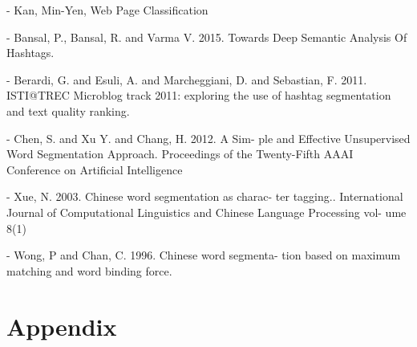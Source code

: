 \documentclass[12pt]{comjnl}
\begin{document}
- Kan, Min-Yen, Web Page Classification

- Bansal, P., Bansal, R. and Varma V. 2015. Towards
Deep Semantic Analysis Of Hashtags.

- Berardi, G. and Esuli, A. and Marcheggiani, D. and
Sebastian, F. 2011. ISTI@TREC Microblog track
2011: exploring the use of hashtag segmentation
and text quality ranking.

- Chen, S. and Xu Y. and Chang, H. 2012. A Sim-
ple and Effective Unsupervised Word Segmentation
Approach. Proceedings of the Twenty-Fifth AAAI
Conference on Artificial Intelligence

- Xue, N. 2003. Chinese word segmentation as charac-
ter tagging.. International Journal of Computational
Linguistics and Chinese Language Processing vol-
ume 8(1)

- Wong, P and Chan, C. 1996. Chinese word segmenta-
tion based on maximum matching and word binding
force.
\nocite{*}




\section{Appendix}
\end{document}
